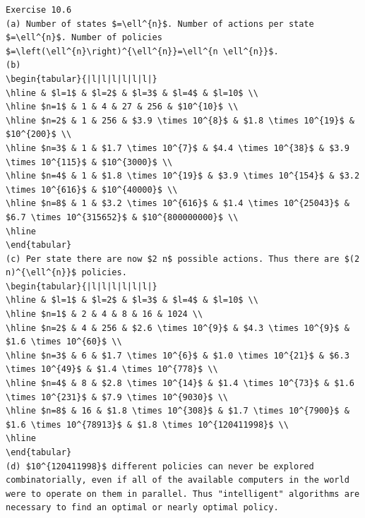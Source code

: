 \documentclass[10pt]{book}
\begin{document}
\begin{verbatim}
Exercise 10.6
(a) Number of states $=\ell^{n}$. Number of actions per state $=\ell^{n}$. Number of policies $=\left(\ell^{n}\right)^{\ell^{n}}=\ell^{n \ell^{n}}$.
(b)
\begin{tabular}{|l|l|l|l|l|l|}
\hline & $l=1$ & $l=2$ & $l=3$ & $l=4$ & $l=10$ \\
\hline $n=1$ & 1 & 4 & 27 & 256 & $10^{10}$ \\
\hline $n=2$ & 1 & 256 & $3.9 \times 10^{8}$ & $1.8 \times 10^{19}$ & $10^{200}$ \\
\hline $n=3$ & 1 & $1.7 \times 10^{7}$ & $4.4 \times 10^{38}$ & $3.9 \times 10^{115}$ & $10^{3000}$ \\
\hline $n=4$ & 1 & $1.8 \times 10^{19}$ & $3.9 \times 10^{154}$ & $3.2 \times 10^{616}$ & $10^{40000}$ \\
\hline $n=8$ & 1 & $3.2 \times 10^{616}$ & $1.4 \times 10^{25043}$ & $6.7 \times 10^{315652}$ & $10^{800000000}$ \\
\hline
\end{tabular}
(c) Per state there are now $2 n$ possible actions. Thus there are $(2 n)^{\ell^{n}}$ policies.
\begin{tabular}{|l|l|l|l|l|l|}
\hline & $l=1$ & $l=2$ & $l=3$ & $l=4$ & $l=10$ \\
\hline $n=1$ & 2 & 4 & 8 & 16 & 1024 \\
\hline $n=2$ & 4 & 256 & $2.6 \times 10^{9}$ & $4.3 \times 10^{9}$ & $1.6 \times 10^{60}$ \\
\hline $n=3$ & 6 & $1.7 \times 10^{6}$ & $1.0 \times 10^{21}$ & $6.3 \times 10^{49}$ & $1.4 \times 10^{778}$ \\
\hline $n=4$ & 8 & $2.8 \times 10^{14}$ & $1.4 \times 10^{73}$ & $1.6 \times 10^{231}$ & $7.9 \times 10^{9030}$ \\
\hline $n=8$ & 16 & $1.8 \times 10^{308}$ & $1.7 \times 10^{7900}$ & $1.6 \times 10^{78913}$ & $1.8 \times 10^{120411998}$ \\
\hline
\end{tabular}
(d) $10^{120411998}$ different policies can never be explored combinatorially, even if all of the available computers in the world were to operate on them in parallel. Thus "intelligent" algorithms are necessary to find an optimal or nearly optimal policy.


\end{verbatim}
\end{document}
